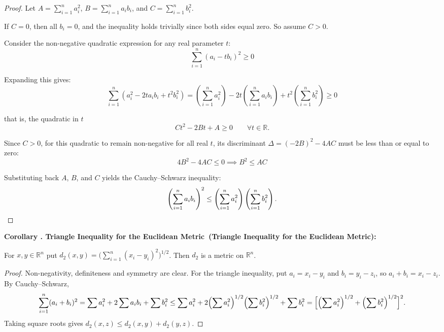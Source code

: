 \documentclass[11pt,a4paper]{article}
\newcommand{\R}{\mathbb{R}}
\newcounter{thmcnt}[section]
\renewcommand{\thethmcnt}{\thesection.\arabic{thmcnt}}
\newenvironment{corollary}[1][]{
	\def\temp{#1}%
	\refstepcounter{thmcnt}
	\begin{corollarybox}
		\textbf{\color{corollaryColor}Corollary \thethmcnt%
			\ifx\temp\empty\relax\else\ (#1)\fi:} 
	}{
	\end{corollarybox}
}
\begin{document}
	\begin{proof}
		Let $A = \sum_{i=1}^{n} a_i^2$, $B = \sum_{i=1}^{n} a_i b_i$, and $C = \sum_{i=1}^{n} b_i^2$.
		
		\noindent If $C = 0$, then all $b_i = 0$, and the inequality holds trivially since both sides equal zero. So assume $C > 0$.
		
		\noindent Consider the non-negative quadratic expression for any real parameter $t$:
		\[ \sum_{i=1}^{n} (a_i - t b_i)^2 \geq 0 \]
		
		\noindent Expanding this gives:
		\[ \sum_{i=1}^{n} \left(a_i^2 - 2t a_i b_i + t^2 b_i^2\right) = \left(\sum_{i=1}^{n} a_i^2\right) - 2t \left(\sum_{i=1}^{n} a_i b_i\right) + t^2 \left(\sum_{i=1}^{n} b_i^2\right) \geq 0 \]
		
		\noindent that is, the quadratic in $t$
		\[ Ct^2 - 2Bt + A \geq 0 \qquad \forall t \in \R. \]
		
		\noindent Since $C > 0$, for this quadratic to remain non-negative for all real $t$, its discriminant $\Delta = (-2B)^2 - 4AC$ must be less than or equal to zero:
		\[ 4B^2 - 4AC \leq 0 \implies B^2 \leq AC \]
		
		\noindent Substituting back $A$, $B$, and $C$ yields the Cauchy--Schwarz inequality:
		\[ \left( \sum_{i=1}^{n} a_i b_i \right)^2 \leq \left( \sum_{i=1}^{n} a_i^2 \right) \left( \sum_{i=1}^{n} b_i^2 \right). \qedhere \]
	\end{proof}
	
	\begin{corollary}[Triangle Inequality for the Euclidean Metric]
		\label{cor:euclidtriangle}
		For $x, y \in \R^n$ put $d_2(x,y) = \bigl(\sum_{i=1}^n (x_i - y_i)^2\bigr)^{1/2}$. Then $d_2$ is a metric on $\R^n$.
	\end{corollary}
	
	\begin{proof}
		Non-negativity, definiteness and symmetry are clear. For the triangle inequality, put $a_i = x_i - y_i$ and $b_i = y_i - z_i$, so $a_i + b_i = x_i - z_i$. By Cauchy--Schwarz,
		\[
		\sum_{i=1}^n (a_i + b_i)^2 = \sum a_i^2 + 2\sum a_i b_i + \sum b_i^2 \le \sum a_i^2 + 2\Bigl(\sum a_i^2\Bigr)^{1/2}\Bigl(\sum b_i^2\Bigr)^{1/2} + \sum b_i^2 = \Bigl[\Bigl(\sum a_i^2\Bigr)^{1/2} + \Bigl(\sum b_i^2\Bigr)^{1/2}\Bigr]^2 .
		\]
		Taking square roots gives $d_2(x,z) \le d_2(x,y) + d_2(y,z)$.
	\end{proof}
	
\end{document}
